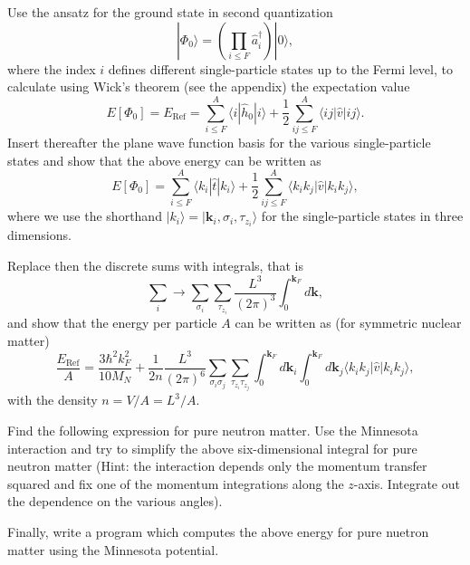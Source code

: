   \begin{prob}\label{problem:referenceE}
  Use the ansatz for the ground state in second quantization
  \[
  |\Phi_0\rangle = \left(\prod_{i\le
    F}\hat{a}_{i}^{\dagger}\right)|0\rangle,
  \]
  where the index $i$ defines different single-particle states up to
  the Fermi level, to calculate using Wick's theorem (see the
  appendix) the expectation value
  \[
    E[\Phi_0]= E_{\mathrm{Ref}}= \sum_{i\le F}^A \langle i | \hat{h}_0
    | i \rangle + \frac{1}{2}\sum_{ij\le F}^A\langle
    ij|\hat{v}|ij\rangle.
  \]
  Insert thereafter the plane wave function basis for the various
  single-particle states and show that the above energy can be written
  as
  \[
    E[\Phi_0] = \sum_{i\le F}^A \langle k_i | \hat{t} | k_i \rangle +
    \frac{1}{2}\sum_{ij\le F}^A\langle
    k_ik_j|\hat{v}|k_ik_j\rangle,
  \]
  where we use the shorthand $\vert k_i\rangle = \vert
  \mathbf{k}_i,\sigma_i,\tau_{z_i}\rangle$ for the single-particle
  states in three dimensions.

  Replace then the discrete sums with integrals, that is
  \[
  \sum_i \rightarrow
  \sum_{\sigma_i}\sum_{\tau_{z_i}}\frac{L^3}{(2\pi)^3}\int_0^{\mathbf{k}_F}d\mathbf{k},
  \]
  and show that the energy per particle $A$ can be written as (for
  symmetric nuclear matter)
  \[
    \frac{E_{\mathrm{Ref}}}{A}=\frac{3\hbar^2k_F^2}{10M_N}+\frac{1}{2n}\frac{L^3}{(2\pi)^6}\sum_{\sigma_i\sigma_j}\sum_{\tau_{z_i}\tau_{z_j}}\int_0^{\mathbf{k}_F}d\mathbf{k}_i\int_0^{\mathbf{k}_F}d\mathbf{k}_j\langle
    k_ik_j|\hat{v}|k_ik_j\rangle,
  \]
  with the density $n=V/A=L^3/A$.

  Find the following expression for pure neutron matter. Use the
  Minnesota interaction and try to simplify the above six-dimensional
  integral for pure neutron matter (Hint: the interaction depends only
  the momentum transfer squared and fix one of the momentum
  integrations along the $z$-axis. Integrate out the dependence on the
  various angles).

  Finally, write a program which computes the above energy for pure
  nuetron matter using the Minnesota potential.
  \end{prob}

